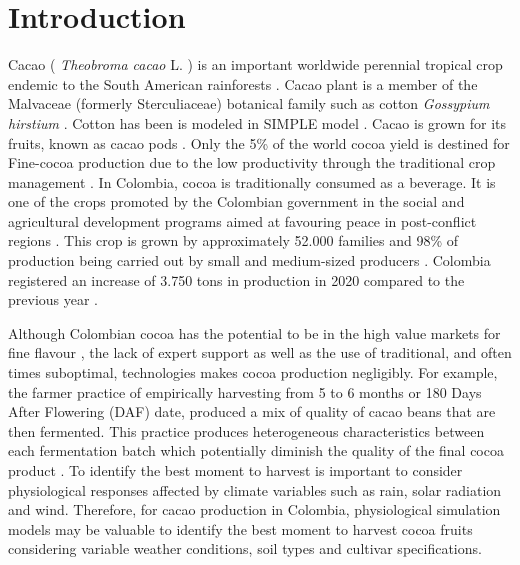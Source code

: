 \documentclass[gene,journal,article,submit,moreauthors,pdftex]{Definitions/mdpi}
\begin{document}

\section{Introduction}

Cacao ( \textit{Theobroma cacao }L. ) is an important worldwide perennial tropical crop endemic to the South American rainforests \citep{zuidema2005, motamayor2002, argout2011, Rodriguez2019}. Cacao plant is a member of the Malvaceae (formerly Sterculiaceae)  botanical family such as  cotton \textit{ Gossypium hirstium} \citep{Nix2017cotton}. Cotton has been is modeled in SIMPLE model \citep{Zao2019simple}. Cacao is grown for its fruits, known as cacao pods \citep{ Niemenak2010, suarez2021}. Only the 5\% of the world cocoa yield is destined for Fine-cocoa production due to the low productivity through  the traditional crop management \citep{argout2011}.  In Colombia, cocoa  is  traditionally  consumed  as  a  beverage. It is one of the crops promoted by the Colombian government in the social and agricultural development  programs aimed at favouring peace in post-conflict regions \citep{Rodriguez2019, Abbott2019}. This crop is grown by approximately 52.000 families \citep{Gutierrez2020} and 98\% of production being carried out by small and medium-sized producers \citep{Garcia2014, Escobar2020}. Colombia registered an increase of 3.750 tons in production in 2020 compared to the previous year \citep{lamos2020}. 

Although Colombian cocoa has the potential to be in the high value markets for fine flavour \citep{Escobar2020}, the lack of expert support as well as the use of traditional, and often times suboptimal, technologies makes cocoa production negligibly. For example, the farmer practice of empirically harvesting from 5 to 6 months or 180 Days After Flowering  (DAF) date, produced a mix of quality of cacao beans that are then fermented. This practice produces heterogeneous characteristics between each fermentation batch which potentially diminish the quality of the final cocoa product \citep{Escobar2021}. To identify the best moment to harvest is important to consider physiological responses affected by climate variables such as rain, solar radiation and wind.  Therefore,  for cacao production in Colombia, physiological simulation models may be valuable to identify the best moment to harvest cocoa fruits considering variable weather conditions, soil types and cultivar specifications. 
\end{document}
